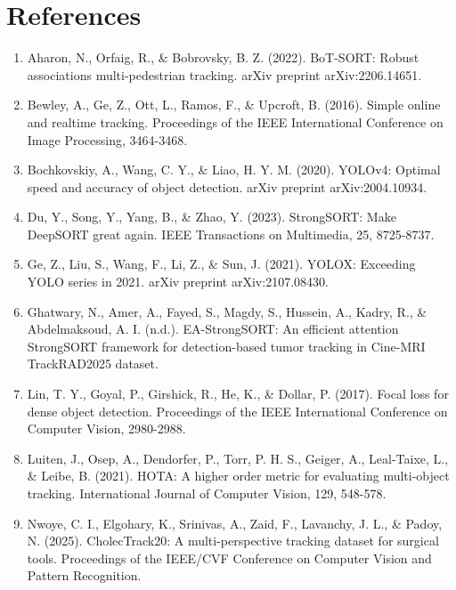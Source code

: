 \documentclass[12pt,a4paper]{article}
\begin{document}
\section*{References}

\begin{enumerate}

\item Aharon, N., Orfaig, R., \& Bobrovsky, B. Z. (2022). BoT-SORT: Robust associations multi-pedestrian tracking. arXiv preprint arXiv:2206.14651.

\item Bewley, A., Ge, Z., Ott, L., Ramos, F., \& Upcroft, B. (2016). Simple online and realtime tracking. Proceedings of the IEEE International Conference on Image Processing, 3464-3468.

\item Bochkovskiy, A., Wang, C. Y., \& Liao, H. Y. M. (2020). YOLOv4: Optimal speed and accuracy of object detection. arXiv preprint arXiv:2004.10934.

\item Du, Y., Song, Y., Yang, B., \& Zhao, Y. (2023). StrongSORT: Make DeepSORT great again. IEEE Transactions on Multimedia, 25, 8725-8737.

\item Ge, Z., Liu, S., Wang, F., Li, Z., \& Sun, J. (2021). YOLOX: Exceeding YOLO series in 2021. arXiv preprint arXiv:2107.08430.

\item Ghatwary, N., Amer, A., Fayed, S., Magdy, S., Hussein, A., Kadry, R., \& Abdelmaksoud, A. I. (n.d.). EA-StrongSORT: An efficient attention StrongSORT framework for detection-based tumor tracking in Cine-MRI TrackRAD2025 dataset.

\item Lin, T. Y., Goyal, P., Girshick, R., He, K., \& Dollar, P. (2017). Focal loss for dense object detection. Proceedings of the IEEE International Conference on Computer Vision, 2980-2988.

\item Luiten, J., Osep, A., Dendorfer, P., Torr, P. H. S., Geiger, A., Leal-Taixe, L., \& Leibe, B. (2021). HOTA: A higher order metric for evaluating multi-object tracking. International Journal of Computer Vision, 129, 548-578.

\item Nwoye, C. I., Elgohary, K., Srinivas, A., Zaid, F., Lavanchy, J. L., \& Padoy, N. (2025). CholecTrack20: A multi-perspective tracking dataset for surgical tools. Proceedings of the IEEE/CVF Conference on Computer Vision and Pattern Recognition.


\end{enumerate}
\end{document}
